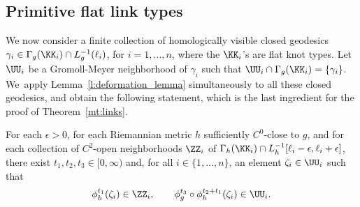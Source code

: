 \subsection{Primitive flat link types}
We now consider a finite collection of homologically visible closed geodesics $\gamma_i\in\Gamma_g(\KK_i)\cap L_g^{-1}(\ell_i)$, for $i=1,\dots,n$, where the $\KK_i$'s are flat knot types. Let $\UU_i$ be a Gromoll-Meyer neighborhood of $\gamma_i$ such that $\UU_i\cap\Gamma_g(\KK_i)=\{\gamma_i\}$. We~apply Lemma~\ref{l:deformation_lemma} simultaneously to all these closed geodesics, and obtain the following statement, which is the last ingredient for the proof of Theorem~\ref{mt:links}.

\begin{Lemma}\label{l:intertwining}
For each $\epsilon>0$, for each Riemannian metric $h$ sufficiently $C^0$-close to $g$, and for each collection of $C^2$-open neighborhoods $\ZZ_i$ of $\Gamma_h(\KK_i)\cap L_h^{-1}[\ell_i-\epsilon,\ell_i+\epsilon]$, there exist $t_1,t_2,t_3\in[0,\infty)$ and, for all $i\in\{1,\dots,n\}$, an element $\zeta_i\in\UU_i$ such that
\[
\phi_h^{t_1}(\zeta_i)\in\ZZ_i,
\qquad
\phi_g^{t_3}\circ\phi_h^{t_2+t_1}(\zeta_i)\in\UU_i.
\]
\end{Lemma}

